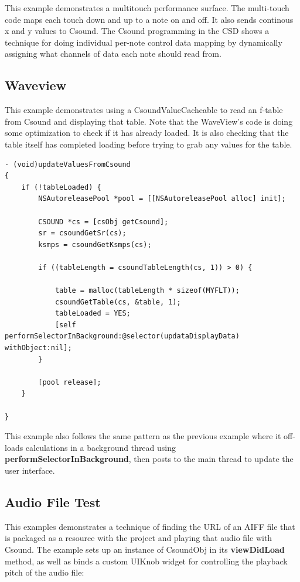 \documentclass[11pt]{article}
\begin{document}
This example demonstrates a multitouch performance surface. The multi-touch code maps each touch down and up to a note on and off.  It also sends continous x and y values to Csound.  The Csound programming in the CSD shows a technique for doing individual per-note control data mapping by dynamically assigning what channels of data each note should read from. 

\subsection{Waveview}

This example demonstrates using a CsoundValueCacheable to read an f-table from Csound and displaying that table.  Note that the WaveView's code is doing some optimization to check if it has already loaded.  It is also checking that the table itself has completed loading before trying to grab any values for the table. 

\begin{lstlisting}[caption=Waveview code demonstrating reading f-tables from Csound]
- (void)updateValuesFromCsound
{
    if (!tableLoaded) {
        NSAutoreleasePool *pool = [[NSAutoreleasePool alloc] init];

        CSOUND *cs = [csObj getCsound];
        sr = csoundGetSr(cs);
        ksmps = csoundGetKsmps(cs);
        
        if ((tableLength = csoundTableLength(cs, 1)) > 0) {

            table = malloc(tableLength * sizeof(MYFLT));
            csoundGetTable(cs, &table, 1);
            tableLoaded = YES;
            [self performSelectorInBackground:@selector(updataDisplayData) withObject:nil];
        }

        [pool release];
    }

}
\end{lstlisting}

This example also follows the same pattern as the previous example where it off-loads calculations in a background thread using \textbf{performSelectorInBackground}, then posts to the main thread to update the user interface.

\subsection{Audio File Test}

This examples demonstrates a technique of finding the URL of an AIFF file that is packaged as a resource with the project and playing that audio file with Csound.  The example sets up an instance of CsoundObj in its \textbf{viewDidLoad} method, as well as binds a custom UIKnob widget for controlling the playback pitch of the audio file:
\end{document}
